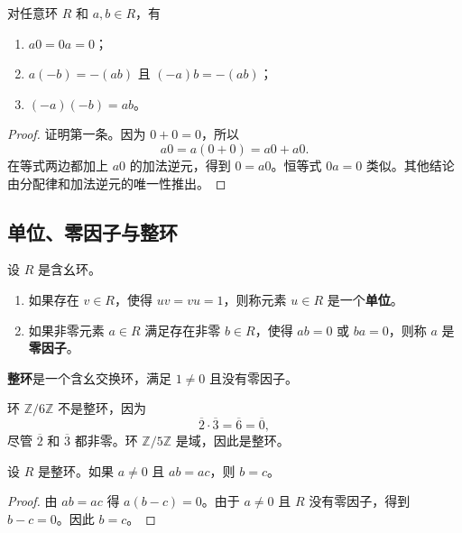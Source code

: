 \begin{proposition}[环的初等恒等式]
对任意环 $R$ 和 $a,b\in R$，有
\begin{enumerate}
    \item $a0=0a=0$；
    \item $a(-b)=-(ab)$ 且 $(-a)b=-(ab)$；
    \item $(-a)(-b)=ab$。
\end{enumerate}
\end{proposition}

\begin{proof}
证明第一条。因为 $0+0=0$，所以
\[
    a0=a(0+0)=a0+a0.
\]
在等式两边都加上 $a0$ 的加法逆元，得到 $0=a0$。恒等式 $0a=0$ 类似。其他结论由分配律和加法逆元的唯一性推出。
\end{proof}

\subsection{单位、零因子与整环}

\begin{definition}[单位与零因子]
设 $R$ 是含幺环。
\begin{enumerate}
    \item 如果存在 $v\in R$，使得 $uv=vu=1$，则称元素 $u\in R$ 是一个\textbf{单位}。
    \item 如果非零元素 $a\in R$ 满足存在非零 $b\in R$，使得 $ab=0$ 或 $ba=0$，则称 $a$ 是\textbf{零因子}。
\end{enumerate}
\end{definition}

\begin{definition}[整环]
\textbf{整环}是一个含幺交换环，满足 $1\neq 0$ 且没有零因子。
\end{definition}

\begin{example}
环 $\mathbb{Z}/6\mathbb{Z}$ 不是整环，因为
\[
    \overline{2}\cdot\overline{3}=\overline{6}=\overline{0},
\]
尽管 $\overline{2}$ 和 $\overline{3}$ 都非零。环 $\mathbb{Z}/5\mathbb{Z}$ 是域，因此是整环。
\end{example}

\begin{proposition}[整环中的消去律]
设 $R$ 是整环。如果 $a\neq 0$ 且 $ab=ac$，则 $b=c$。
\end{proposition}

\begin{proof}
由 $ab=ac$ 得 $a(b-c)=0$。由于 $a\neq 0$ 且 $R$ 没有零因子，得到 $b-c=0$。因此 $b=c$。
\end{proof}


